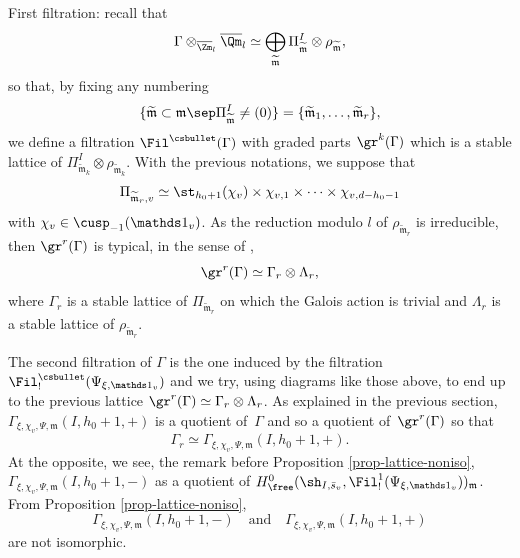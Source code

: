 \begin{enumeratea}
\item
First filtration:
recall that
\[
\Gamma \otimes_{\overline \Zm_l} \overline \Qm_l \simeq
\bigoplus_{\widetilde{\mathfrak m}} \Pi_{\widetilde{\mathfrak m}}^I \otimes
\rho_{\widetilde{\mathfrak m}},
\]
so that, by fixing any numbering
\[
\{\widetilde{\mathfrak m} \subset \mathfrak m \sep
\Pi_{\widetilde{\mathfrak m}}^I \neq (0)\}=
\{\widetilde{\mathfrak m}_1,\dots, \widetilde{\mathfrak m}_r\},
\]
we define a filtration $\Fil^{\csbullet}(\Gamma)$ with graded parts
$\gr^k(\Gamma)$ which is a stable lattice of
$\Pi^I_{\widetilde{\mathfrak m}_k} \otimes \rho_{\widetilde{\mathfrak m}_k}$.
With the previous notations, we suppose that
\[
\Pi_{\widetilde{\mathfrak m}_r,v}
\simeq \st_{h_0+1}(\chi_v) \times \chi_{v,1} \times \cdots \times \chi_{v,d-h_0-1}
\]
with $\chi_v \in \cusp_{-1}(\mathds 1_v)$. As the reduction modulo $l$ of
$\rho_{\widetilde{\mathfrak m}_r}$ is irreducible, then
$\gr^r(\Gamma)$ is typical, in the sense of \cite[\S5]{scholze-LT}, \ie\[
\gr^r(\Gamma) \simeq \Gamma_r \otimes \Lambda_r,
\]
where $\Gamma_r$ is a stable lattice of $\Pi_{\widetilde{\mathfrak m}_r}$ on
which the Galois action is trivial and $\Lambda_r$ is a stable lattice of
$\rho_{\widetilde{\mathfrak m}_r}$.

\item
The second filtration of $\Gamma$ is the one induced by the filtration
$\Fil^{\csbullet}_!(\Psi_{\xi,\mathds 1_v})$ and we try, using diagrams like those above,
to end up
to the previous lattice $\gr^r(\Gamma) \simeq \Gamma_r \otimes \Lambda_r$.
As explained in the previous section, $\Gamma_{\xi,\chi_v,\Psi,\mathfrak m}
(I,h_0+1,+)$ is a quotient of~$\Gamma$ and so a quotient of~$\gr^r(\Gamma)$
so that
\[
\Gamma_r \simeq \Gamma_{\xi,\chi_v,\Psi,\mathfrak m} (I,h_0+1,+).
\]
At the opposite, we see, \cf the remark before Proposition \ref{prop-lattice-noniso},
$\Gamma_{\xi,\chi_v,\Psi,\mathfrak m} (I,h_0+1,-)$
as a quotient of
$H^0_{\free}(\sh_{I,\bar s_v},\Fil^1_!(\Psi_{\xi,\mathds 1_v}))_{\mathfrak m}$.
From Proposition \ref{prop-lattice-noniso},
\[
\Gamma_{\xi,\chi_v,\Psi,\mathfrak m} (I,h_0+1,-)\quad\text{and}\quad\Gamma_{\xi,\chi_v,\Psi,\mathfrak m} (I,h_0+1,+)
\]
are not isomorphic.


\end{enumeratea}
